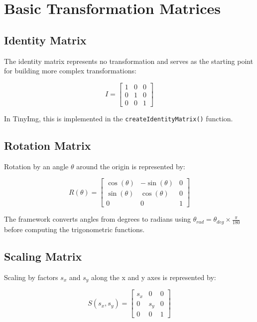 \documentclass{article}
\begin{document}
\section{Basic Transformation Matrices}

\subsection{Identity Matrix}

The identity matrix represents no transformation and serves as the starting point for building more complex transformations:

\begin{equation}
I = \begin{bmatrix}
1 & 0 & 0 \\
0 & 1 & 0 \\
0 & 0 & 1
\end{bmatrix}
\end{equation}

In TinyImg, this is implemented in the \texttt{createIdentityMatrix()} function.

\subsection{Rotation Matrix}

Rotation by an angle $\theta$ around the origin is represented by:

\begin{equation}
R(\theta) = \begin{bmatrix}
\cos(\theta) & -\sin(\theta) & 0 \\
\sin(\theta) & \cos(\theta) & 0 \\
0 & 0 & 1
\end{bmatrix}
\end{equation}

The framework converts angles from degrees to radians using $\theta_{rad} = \theta_{deg} \times \frac{\pi}{180}$ before computing the trigonometric functions.

\subsection{Scaling Matrix}

Scaling by factors $s_x$ and $s_y$ along the x and y axes is represented by:

\begin{equation}
S(s_x, s_y) = \begin{bmatrix}
s_x & 0 & 0 \\
0 & s_y & 0 \\
0 & 0 & 1
\end{bmatrix}
\end{equation}
\end{document}
